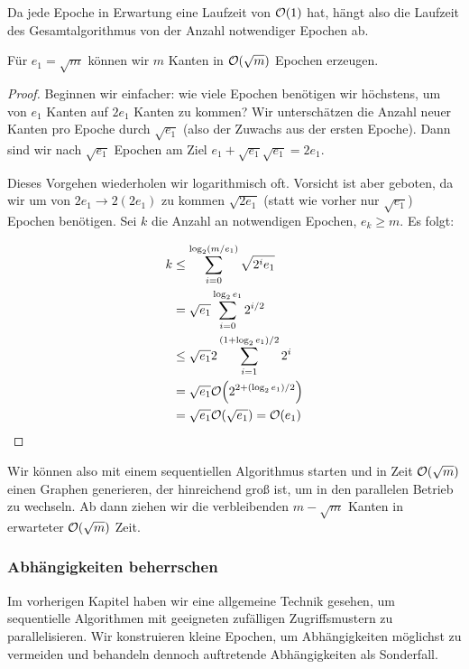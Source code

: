 Da jede Epoche in Erwartung eine Laufzeit von $\mathcal{O}\!\left(1\right)$ hat, hängt also die Laufzeit des Gesamtalgorithmus von der Anzahl notwendiger Epochen ab.

\begin{lemma}
    Für $e_1 = \sqrt{m}$ können wir $m$ Kanten in $\mathcal{O}\!\left(\sqrt{m}\right)$ Epochen erzeugen.
\end{lemma}

\begin{proof}
    Beginnen wir einfacher: wie viele Epochen benötigen wir höchstens, um von $e_1$ Kanten auf $2e_1$ Kanten zu kommen?
    Wir unterschätzen die Anzahl neuer Kanten pro Epoche durch $\sqrt{e_1}$ (also der Zuwachs aus der ersten Epoche).
    Dann sind wir nach $\sqrt{e_1}$ Epochen am Ziel $e_1 + \sqrt{e_1} \sqrt{e_1} = 2 e_1$.

    Dieses Vorgehen wiederholen wir logarithmisch oft.
    Vorsicht ist aber geboten, da wir um von $2e_1 \to 2(2e_1)$ zu kommen $\sqrt{2 e_1}$ (statt wie vorher nur $\sqrt{e_1}$) Epochen benötigen.
    Sei $k$ die Anzahl an notwendigen Epochen, \dh $e_k \ge m$.
    Es folgt:

    \begin{align}
        k & \le \sum_{i=0}^{\log_2(m/e_1)} \sqrt{2^i e_1}      \\
          & = \sqrt{e_1} \sum_{i=0}^{\log_2 e_1} 2^{i/2}       \\
          & \le \sqrt{e_1} 2 \sum_{i=1}^{(1+\log_2 e_1)/2} 2^i \\
          & = \sqrt{e_1} \mathcal{O}\!\left(2^{2 + (\log_2 e_1) / 2}\right)         \\
          & = \sqrt{e_1} \mathcal{O}\!\left(\sqrt{e_1}\right) = \mathcal{O}\!\left(e_1\right)
    \end{align}
\end{proof}

Wir können also mit einem sequentiellen Algorithmus starten und in Zeit $\mathcal{O}\!\left(\sqrt m\right)$ einen Graphen generieren, der hinreichend groß ist, um in den parallelen Betrieb zu wechseln.
Ab dann ziehen wir die verbleibenden $m - \sqrt{m}$ Kanten in erwarteter $\mathcal{O}\!\left(\sqrt m\right)$ Zeit.

\subsubsection{Abhängigkeiten beherrschen}\label{subsec:ba_sanders}
Im vorherigen Kapitel haben wir eine allgemeine Technik gesehen, um sequentielle Algorithmen mit geeigneten zufälligen Zugriffsmustern zu parallelisieren.
Wir konstruieren kleine Epochen, um Abhängigkeiten möglichst zu vermeiden und behandeln dennoch auftretende Abhängigkeiten als Sonderfall.

